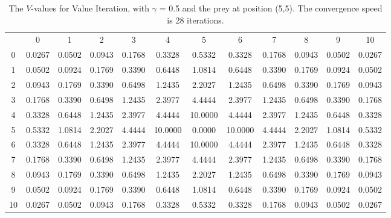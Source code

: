 \documentclass{article}
\begin{document}
\begin{landscape}
\begin{table}[tbp]
\centering
\begin{tabular} {c c c c c c c c c c c c}
 & 0 & 1 & 2 & 3 & 4 & 5 & 6 & 7 & 8 & 9 & 10 \\
 0 & 0.0267 &  0.0502 &  0.0943 &  0.1768 &  0.3328 &  0.5332 &  0.3328 &  0.1768 &  0.0943 &  0.0502 &  0.0267\\
1 & 0.0502 &  0.0924 &  0.1769 &  0.3390 &  0.6448 &  1.0814 &  0.6448 &  0.3390 &  0.1769 &  0.0924 &  0.0502\\
2 & 0.0943 &  0.1769 &  0.3390 &  0.6498 &  1.2435 &  2.2027 &  1.2435 &  0.6498 &  0.3390 &  0.1769 &  0.0943\\
3 & 0.1768 &  0.3390 &  0.6498 &  1.2435 &  2.3977 &  4.4444 &  2.3977 &  1.2435 &  0.6498 &  0.3390 &  0.1768\\
4 & 0.3328 &  0.6448 &  1.2435 &  2.3977 &  4.4444 & 10.0000 &  4.4444 &  2.3977 &  1.2435 &  0.6448 &  0.3328\\
5 & 0.5332 &  1.0814 &  2.2027 &  4.4444 & 10.0000 &  0.0000 & 10.0000 &  4.4444 &  2.2027 &  1.0814 &  0.5332\\
6 & 0.3328 &  0.6448 &  1.2435 &  2.3977 &  4.4444 & 10.0000 &  4.4444 &  2.3977 &  1.2435 &  0.6448 &  0.3328\\
7 & 0.1768 &  0.3390 &  0.6498 &  1.2435 &  2.3977 &  4.4444 &  2.3977 &  1.2435 &  0.6498 &  0.3390 &  0.1768\\
8 & 0.0943 &  0.1769 &  0.3390 &  0.6498 &  1.2435 &  2.2027 &  1.2435 &  0.6498 &  0.3390 &  0.1769 &  0.0943\\
9 & 0.0502 &  0.0924 &  0.1769 &  0.3390 &  0.6448 &  1.0814 &  0.6448 &  0.3390 &  0.1769 &  0.0924 &  0.0502\\
10 & 0.0267 &  0.0502 &  0.0943 &  0.1768 &  0.3328 &  0.5332 &  0.3328 &  0.1768 &  0.0943 &  0.0502 &  0.0267\\
\end{tabular}\\
\caption{The $V$-values for Value Iteration, with $\gamma$ = 0.5 and the prey at position (5,5). The convergence speed is 28 iterations.}
\label{valueiteration2}
\end{table}


\end{landscape}
\end{document}
